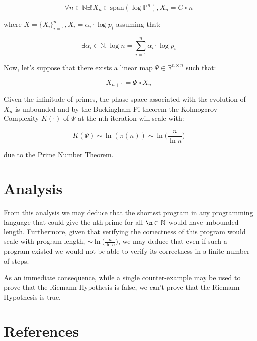 \documentclass{article}
\begin{document}
\begin{equation}
\forall n \in \mathbb{N} \exists! X_n \in \text{span}(\log \mathbb{P}^n), X_n = G \circ n
\end{equation}

where $X = \{X_i\}_{i=1}^n, X_i = \alpha_i \cdot \log p_i$ assuming that:

\begin{equation}
\exists \alpha_i \in \mathbb{N}, \log n = \sum_{i=1}^n \alpha_i \cdot \log p_i
\end{equation}

Now, let's suppose that there exists a linear map $\Psi \in \mathbb{R}^{n \times n}$ such that:

\begin{equation}
X_{n+1} = \Psi \circ X_n
\end{equation}

Given the infinitude of primes, the phase-space associated with the evolution of $X_n$ is unbounded and by the Buckingham-Pi
theorem the Kolmogorov Complexity $K(\cdot)$ of $\Psi$ at the nth iteration will scale with:

\begin{equation}
K(\Psi) \sim \ln(\pi(n)) \sim \ln \big(\frac{n}{\ln n}\big)
\end{equation}

due to the Prime Number Theorem.

\newpage

\section{Analysis}

From this analysis we may deduce that the shortest program in any programming language that could give the nth prime for all $\n \in \mathbb{N}$ would have unbounded length. Furthermore, given that verifying the correctness of this program would scale with program length, $ \sim \ln \big(\frac{n}{\ln n}\big)$, we may deduce that even if such a program existed we would not be able to verify its correctness in a finite number of steps. 

As an immediate consequence, while a single counter-example may be used to prove that the Riemann Hypothesis is false, we can’t prove that the Riemann Hypothesis is true.

\section*{References}
\end{document}
